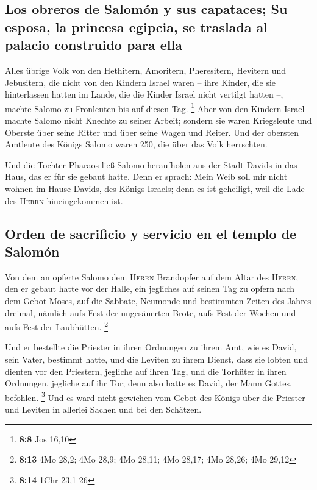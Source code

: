 \hypertarget{los-obreros-de-salomuxf3n-y-sus-capataces-su-esposa-la-princesa-egipcia-se-traslada-al-palacio-construido-para-ella}{%
\subsection{Los obreros de Salomón y sus capataces; Su esposa, la
princesa egipcia, se traslada al palacio construido para
ella}\label{los-obreros-de-salomuxf3n-y-sus-capataces-su-esposa-la-princesa-egipcia-se-traslada-al-palacio-construido-para-ella}}

 Alles übrige Volk von den Hethitern, Amoritern,
Pheresitern, Hevitern und Jebusitern, die nicht von den Kindern Israel
waren --  ihre Kinder, die sie hinterlassen hatten im
Lande, die die Kinder Israel nicht vertilgt hatten --, machte Salomo zu
Fronleuten bis auf diesen Tag. \footnote{\textbf{8:8} Jos 16,10}
 Aber von den Kindern Israel machte Salomo nicht Knechte
zu seiner Arbeit; sondern sie waren Kriegsleute und Oberste über seine
Ritter und über seine Wagen und Reiter.  Und der obersten
Amtleute des Königs Salomo waren 250, die über das Volk herrschten.

 Und die Tochter Pharaos ließ Salomo heraufholen aus der
Stadt Davids in das Haus, das er für sie gebaut hatte. Denn er sprach:
Mein Weib soll mir nicht wohnen im Hause Davids, des Königs Israels;
denn es ist geheiligt, weil die Lade des \textsc{Herrn} hineingekommen
ist.

\hypertarget{orden-de-sacrificio-y-servicio-en-el-templo-de-salomuxf3n}{%
\subsection{Orden de sacrificio y servicio en el templo de
Salomón}\label{orden-de-sacrificio-y-servicio-en-el-templo-de-salomuxf3n}}

 Von dem an opferte Salomo dem \textsc{Herrn} Brandopfer
auf dem Altar des \textsc{Herrn}, den er gebaut hatte vor der Halle,
 ein jegliches auf seinen Tag zu opfern nach dem Gebot
Moses, auf die Sabbate, Neumonde und bestimmten Zeiten des Jahres
dreimal, nämlich aufs Fest der ungesäuerten Brote, aufs Fest der Wochen
und aufs Fest der Laubhütten. \footnote{\textbf{8:13} 4Mo 28,2; 4Mo
  28,9; 4Mo 28,11; 4Mo 28,17; 4Mo 28,26; 4Mo 29,12}

 Und er bestellte die Priester in ihren Ordnungen zu
ihrem Amt, wie es David, sein Vater, bestimmt hatte, und die Leviten zu
ihrem Dienst, dass sie lobten und dienten vor den Priestern, jegliche
auf ihren Tag, und die Torhüter in ihren Ordnungen, jegliche auf ihr
Tor; denn also hatte es David, der Mann Gottes, befohlen. \footnote{\textbf{8:14}
  1Chr 23,1-26}  Und es ward nicht gewichen vom Gebot des
Königs über die Priester und Leviten in allerlei Sachen und bei den
Schätzen.

